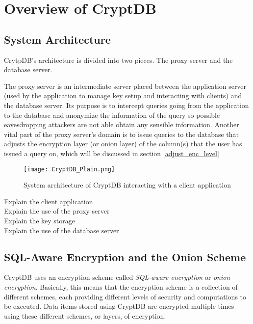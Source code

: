 \chapter{Overview of CryptDB}
\label{chp:overview_cryptDB}

\section{System Architecture}

CrytpDB's architecture is divided into two pieces. The proxy server and the database server.

The proxy server is an intermediate server placed between the application server (used by the application to manage key setup and interacting with clients) and the database server. Its purpose is to intercept queries going from the application to the database and anonymize the information of the query so possible eavesdropping attackers are not able obtain any sensible information. %
Another vital part of the proxy server's domain is to issue queries to the database that adjusts the encryption layer (or onion layer) of the column(s) that the user has issued a query on, which will be discussed in section \ref{adjust_enc_level}

\begin{figure}[h]
	\texttt{[image: CryptDB\_Plain.png]}
	\caption{System architecture of CryptDB interacting with a client application}
	\label{cryptdb_plain}
\end{figure}


Explain the client application\\
Explain the use of the proxy server\\
Explain the key storage\\
Explain the use of the database server\\

\section{SQL-Aware Encryption and the Onion Scheme}

CryptDB uses an encryption scheme called \emph{SQL-aware encryption} or \textit{onion encryption}. Basically, this means that the encryption scheme is a collection of different schemes, each providing different levels of security and computations to be executed. Data items stored using CryptDB are encrypted multiple times using these different schemes, or layers, of encryption.

